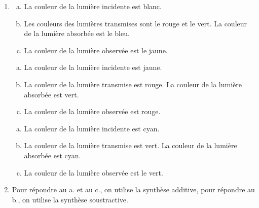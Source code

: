 \documentclass[12pt, a4paper]{article}
\begin{document}
    \begin{Exercise}[number={21}]
        \begin{enumerate}[1.]
            \item	\begin{enumerate}[a.]
                        \item	La couleur de la lumière incidente est blanc.
                        \item   Les couleurs des lumières transmises sont le rouge et le vert. La couleur de la lumière absorbée est le bleu.
                        \item   La couleur de la lumière observée est le jaune.
                    \end{enumerate}
                    \begin{enumerate}[a.]
                        \item	La couleur de la lumière incidente est jaune.
                        \item   La couleur de la lumière transmise est rouge. La couleur de la lumière absorbée est vert.
                        \item   La couleur de la lumière observée est rouge.
                    \end{enumerate}
                    \begin{enumerate}[a.]
                        \item	La couleur de la lumière incidente est cyan.
                        \item   La couleur de la lumière transmise est vert. La couleur de la lumière absorbée est cyan.
                        \item   La couleur de la lumière observée est le vert.
                    \end{enumerate}
            \item   Pour répondre au a. et au c., on utilise la synthèse additive, pour répondre au b., on utilise la synthèse soustractive.
        \end{enumerate}
    \end{Exercise}
\end{document}
